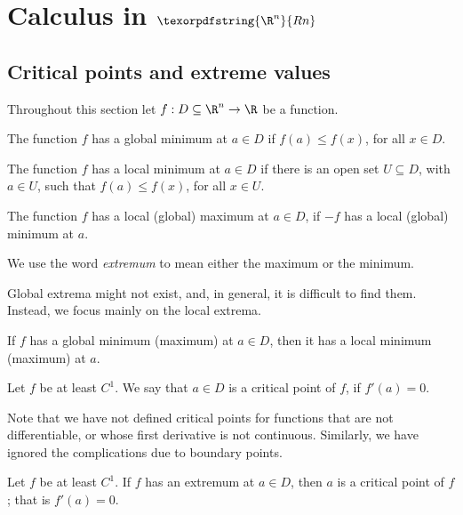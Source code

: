 \section{Calculus in $\texorpdfstring{\R^n}{Rn}$}

\subsection{Critical points and extreme values}
Throughout this section let $f : D \subseteq \R^n \to \R$ be a function.

\begin{ndfn}
  The function $f$ has a global minimum at $a \in D$ if $f(a) \leq f(x)$, for all $x \in D$.
\end{ndfn}
\begin{ndfn}
  The function $f$ has a local minimum at $a \in D$ if there is an open set $U \subseteq D$, with $a \in U$, such that $f(a) \leq f(x)$, for all $x \in U$.
\end{ndfn}
\begin{ndfn}[Maximum]
  The function $f$ has a local (global) maximum at $a \in D$, if $-f$ has a local (global) minimum at $a$.
\end{ndfn}
We use the word \emph{extremum} to mean either the maximum or the minimum.

Global extrema might not exist, and, in general, it is difficult to find them. Instead, we focus mainly on the local extrema.
\begin{nprop}
  If $f$ has a global minimum (maximum) at $a \in D$, then it has a local minimum (maximum) at $a$.
\end{nprop}

\begin{ndfn}
  Let $f$ be at least $C^1$. We say that $a \in D$ is a critical point of $f$, if $f'(a) = 0$.
\end{ndfn}
Note that we have not defined critical points for functions that are not differentiable, or whose first derivative is not continuous. Similarly, we have ignored the complications due to boundary points.
\begin{nthm}
\label{thm:extremum-critical}
  Let $f$ be at least $C^1$. If $f$ has an extremum at $a \in D$, then $a$ is a critical point of $f$; that is $f'(a)=0$.
\end{nthm}

